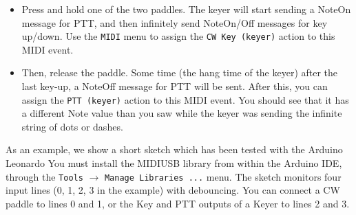\documentclass[12pt]{book}
\def\bltt#1{\texttt{\color{blue}#1}}
\begin{document}
\begin{itemize}
\item{Press and hold one of the two paddles. The keyer will start sending a NoteOn
message for PTT, and then infinitely send NoteOn/Off messages for key up/down.
Use the \bltt{MIDI} menu to assign the \bltt{CW Key (keyer)} action to this MIDI event.}
\item{Then, release the paddle. Some time (the hang time of the keyer) after the last
key-up, a NoteOff message for PTT will be sent. After this, you can assign the
\bltt{PTT (keyer)} action to this MIDI event. You should see that it has a different
Note value than you saw while the keyer was sending the infinite string of dots or
dashes.}
\end{itemize}

As an example, we show a short sketch which has been tested with the Arduino Leonardo
You must install the MIDIUSB library from within the Arduino IDE, through the
\texttt{Tools} $\to$ \texttt{Manage Libraries ...}  menu. The sketch monitors four
input lines (0, 1, 2, 3 in the example) with debouncing. You can connect a CW paddle
to lines 0 and 1, or the Key and PTT outputs of a Keyer to lines 2 and 3.
\end{document}
